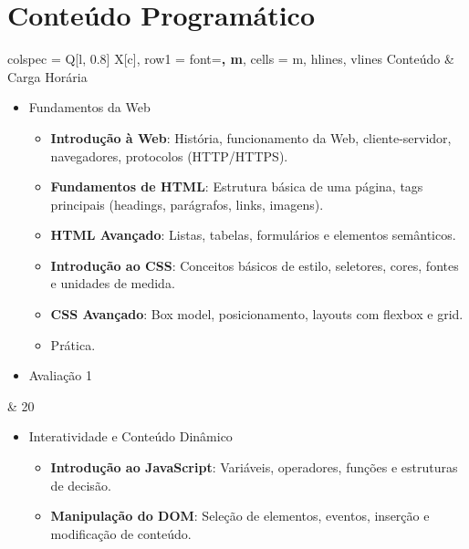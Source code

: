 \documentclass[a4paper, 12pt]{article}
\begin{document}
\newpage
\section{Conteúdo Programático}

\begin{longtblr}{colspec = {Q[l, 0.8\textwidth] X[c]},
        row{1} = {font=\bfseries, m},
        cells = {m},
        hlines, vlines
        }
    Conteúdo & Carga Horária\\
    \begin{itemize}
        \item Fundamentos da Web
            \begin{itemize}
                \item \textbf{Introdução à Web}: História, funcionamento da Web, cliente-servidor, navegadores, protocolos (HTTP/HTTPS).
                \item \textbf{Fundamentos de HTML}: Estrutura básica de uma página, tags principais (headings, parágrafos, links, imagens).
                \item \textbf{HTML Avançado}: Listas, tabelas, formulários e elementos semânticos.
                \item \textbf{Introdução ao CSS}: Conceitos básicos de estilo, seletores, cores, fontes e unidades de medida.
                \item \textbf{CSS Avançado}: Box model, posicionamento, layouts com flexbox e grid.
                \item Prática.
            \end{itemize}
        \item Avaliação 1
    \end{itemize} & 20\\
    \begin{itemize}
        \item Interatividade e Conteúdo Dinâmico
            \begin{itemize}
                \item \textbf{Introdução ao JavaScript}: Variáveis, operadores, funções e estruturas de decisão.
                \item \textbf{Manipulação do DOM}: Seleção de elementos, eventos, inserção e modificação de conteúdo.

\end{itemize}
\end{itemize}
\end{longtblr}
\end{document}
